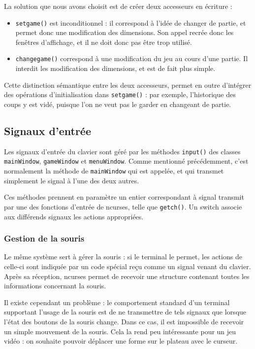 \documentclass[11pt,a4paper]{article}
\begin{document}
La solution que nous avons choisit est de créer deux accesseurs en écriture :
\begin{itemize}
\item 
\verb"setgame()" est inconditionnel : il correspond à l'idée de changer de partie, et permet donc une modification des dimensions. Son appel recrée donc les fenêtres d'affichage, et il ne doit donc pas être trop utilisé.
\item
\verb"changegame()" correspond à une modification du jeu au cours d'une partie. Il interdit les modification des dimensions, et est de fait plus simple.
\end{itemize}

Cette distinction sémantique entre les deux accesseurs, permet en outre d'intégrer des opérations d'initialisation dans \verb"setgame()" : par exemple, l'historique des coups y est vidé, puisque l'on ne veut pas le garder en changeant de partie.

\subsection{Signaux d'entrée}
Les signaux d'entrée du clavier sont géré par les méthodes \verb"input()" des classes \verb"mainWindow", \verb"gameWindow" et \verb"menuWindow". Comme mentionné précédemment, c'est normalement la méthode de \verb"mainWindow" qui est appelée, et qui transmet simplement le signal à l'une des deux autres.

Ces méthodes prennent en paramètre un entier correspondant à signal transmit par une des fonctions d'entrée de ncurses, telle que \verb"getch()". Un switch associe aux différends signaux les actions appropriées.

\subsubsection{Gestion de la souris}
Le même système sert à gérer la souris : si le terminal le permet, les actions de celle-ci sont indiquée par un code spécial reçu comme un signal venant du clavier. Après sa réception, ncurses permet de recevoir une structure contenant toutes les informations concernant la souris.

Il existe cependant un problème : le comportement standard d'un terminal supportant l'usage de la souris est de ne transmettre de tels signaux que lorsque l'état des boutons de la souris change. Dans ce cas, il est impossible de recevoir un simple mouvement de la souris. Cela la rend peu intéressante pour un jeu vidéo : on souhaite pouvoir déplacer une forme sur le plateau avec le curseur.
\end{document}
